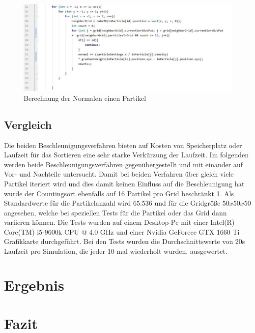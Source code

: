 \documentclass[intern,palatino]{cgBA}
\begin{document}
\begin{figure}[H]
	\centering
	\includegraphics[width=1.3\columnwidth]{Bilder/normal.jpg}
	\caption{Berechnung der Normalen einen Partikel}
	\label{img:normal}
\end{figure}


\subsection{Vergleich}\label{vergleich}

Die beiden Beschleunigungsverfahren bieten auf Kosten von Speicherplatz oder Laufzeit für das Sortieren eine sehr starke Verkürzung der Laufzeit. Im folgenden werden beide Beschleunigungsverfahren gegenübergestellt und mit einander auf Vor- und Nachteile untersucht.
\newline
Damit bei beiden Verfahren über gleich viele Partikel iteriert wird und dies damit keinen Einfluss auf die Beschleunigung hat wurde der Countingsort ebenfalls auf 16 Partikel pro Grid beschränkt \ref{img:normal}. Als Standardwerte für die Partikelanzahl wird $65.536$ und für die Gridgröße $50x50x50$ angesehen, welche bei speziellen Tests für die Partikel oder das Grid dann variieren können.
\newline
Die Tests wurden auf einem Desktop-Pc mit einer Intel(R) Core(TM) i5-9600k CPU @ 4.0 GHz und einer Nvidia GeForece GTX 1660 Ti Grafikkarte durchgeführt. Bei den Tests wurden die Durchschnittswerte von 20s Laufzeit pro Simulation, die jeder 10 mal wiederholt wurden, ausgewertet.

\section{Ergebnis}\label{ergebnis}


\section{Fazit}\label{fazit}



\newpage
\listoffigures
\newpage

\end{document}
